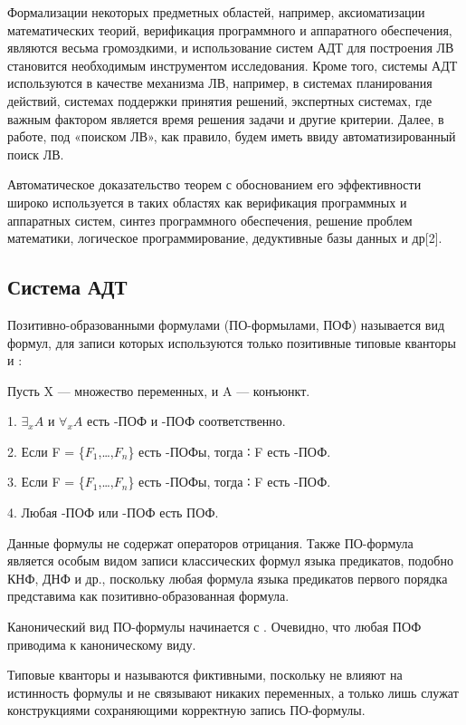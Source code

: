 Формализации некоторых предметных областей, например, аксиоматизации математических теорий, верификация программного и аппаратного обеспечения, являются весьма громоздкими, и использование систем АДТ для построения ЛВ становится необходимым инструментом исследования. Кроме того, системы АДТ используются в качестве механизма ЛВ, например, в системах планирования действий, системах поддержки принятия решений, экспертных системах, где важным фактором является время решения задачи и другие критерии. Далее, в работе, под «поиском ЛВ», как правило, будем иметь ввиду автоматизированный поиск ЛВ.

Автоматическое доказательство теорем с обоснованием его эффективности широко используется в таких областях как верификация программных и аппаратных систем, синтез программного обеспечения, решение проблем математики, логическое программирование, дедуктивные базы данных и др[2].

\subsection*{Система АДТ}

Позитивно-образованными формулами (ПО-формылами, ПОФ) называется вид формул, для записи которых используются только позитивные типовые кванторы \forall{}  и \exists:

Пусть X — множество переменных, и A — конъюнкт.

1. $\exists_x A$ и $\forall_x A$ есть \exists-ПОФ и \forall-ПОФ соответственно.

2. Если F = \{$F_1$,…,$F_n$\} есть \forall-ПОФы, тогда  ∶ F есть \exists-ПОФ.

3. Если F = \{$F_1$,…,$F_n$\} есть \exists-ПОФы, тогда  ∶ F есть \forall-ПОФ.

4. Любая \exists-ПОФ или \forall-ПОФ есть ПОФ.

Данные формулы не содержат операторов отрицания. Также ПО-формула является особым видом записи классических формул языка предикатов, подобно КНФ, ДНФ и др., поскольку любая формула языка предикатов первого порядка представима как позитивно-образованная формула.

Канонический вид ПО-формулы начинается с \forall\emptyset. Очевидно, что любая ПОФ приводима к каноническому виду. 

Типовые кванторы \forall\emptyset и \exists\emptyset называются фиктивными, поскольку не влияют на истинность формулы и не связывают никаких переменных, а только лишь служат конструкциями сохраняющими корректную запись ПО-формулы.

